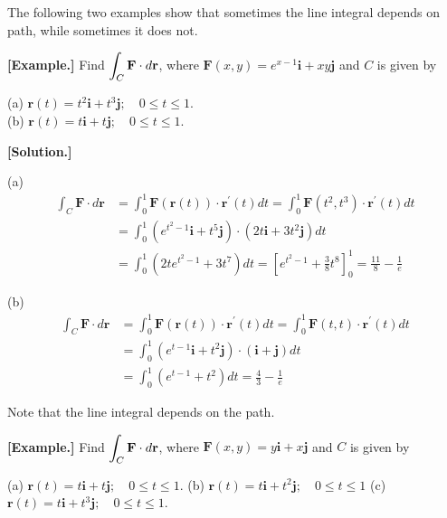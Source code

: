 \documentclass[11pt, a4paper]{MATH2023}
\newcommand{\eg}{\textbf{[Example.] }}
\newcommand{\sol}{\textbf{[Solution.] }}
\begin{document}
\begin{spacing}{1.3}
    {\blue The following two examples show that sometimes the line integral depends on path,
    while sometimes it does not.}

    \eg Find $\displaystyle \int_{C} \mathbf{F} \cdot d \mathbf{r}$, where $\mathbf{F}(x, y)=e^{x-1} \mathbf{i}+x y \mathbf{j}$ 
    and $C$ is given by

    (a) $\mathbf{r}(t)=t^{2} \mathbf{i}+t^{3} \mathbf{j} ; \quad 0 \leqslant t \leqslant 1$.\\
    (b) $\mathbf{r}(t)=t \mathbf{i}+t \mathbf{j} ; \quad 0 \leqslant t \leqslant 1 .$

    \sol 

    (a)
    $$\begin{aligned}
    \int_{C} \mathbf{F} \cdot d \mathbf{r} &=\int_{0}^{1} \mathbf{F}(\mathbf{r}(t)) \cdot \mathbf{r}^{\prime}(t) d t=\int_{0}^{1} \mathbf{F}\left(t^{2}, t^{3}\right) \cdot \mathbf{r}^{\prime}(t) d t \\
    &=\int_{0}^{1}\left(e^{t^{2}-1} \mathbf{i}+t^{5} \mathbf{j}\right) \cdot\left(2 t \mathbf{i}+3 t^{2} \mathbf{j}\right) d t \\
    &=\int_{0}^{1}\left(2 t e^{t^{2}-1}+3 t^{7}\right) d t =\left[e^{t^{2}-1}+\frac{3}{8} t^{8}\right]_{0}^{1}=\frac{11}{8}-\frac{1}{e}
    \end{aligned}$$

    (b)
    $$\begin{aligned}
    \int_{C} \mathbf{F} \cdot d \mathbf{r} &=\int_{0}^{1} \mathbf{F}(\mathbf{r}(t)) \cdot \mathbf{r}^{\prime}(t) d t=\int_{0}^{1} \mathbf{F}(t, t) \cdot \mathbf{r}^{\prime}(t) d t \\
    &=\int_{0}^{1}\left(e^{t-1} \mathbf{i}+t^{2} \mathbf{j}\right) \cdot(\mathbf{i}+\mathbf{j}) d t \\
    &=\int_{0}^{1}\left(e^{t-1}+t^{2}\right) d t =\frac{4}{3}-\frac{1}{e}
    \end{aligned}$$

    {\blue Note that the line integral depends on the path.}
    
    \vspace{0.2in}
    \eg Find $\displaystyle \int_{C} \mathbf{F} \cdot d \mathbf{r}$, where $\mathbf{F}(x, y)=y \mathbf{i}+x \mathbf{j}$ and $C$ is given by
    
    (a) $\mathbf{r}(t)=t \mathbf{i}+t \mathbf{j} ; \quad 0 \leqslant t \leqslant 1$.\hspace{0.2in}
    (b) $\mathbf{r}(t)=t \mathbf{i}+t^{2} \mathbf{j} ; \quad 0 \leqslant t \leqslant 1$\hspace{0.2in}
    (c) $\mathbf{r}(t)=t \mathbf{i}+t^{3} \mathbf{j} ; \quad 0 \leqslant t \leqslant 1$.


\end{spacing}
\end{document}
